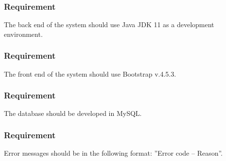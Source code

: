\documentclass{article}
\begin{document}
\subsubsection{Requirement}
The back end of the system should use Java JDK 11 as a development environment.

\subsubsection{Requirement}
The front end of the system should use Bootstrap v.4.5.3.

\subsubsection{Requirement}
The database should be developed in MySQL.

\subsubsection{Requirement}
Error messages should be in the following format: ”Error code – Reason”.
\end{document}
